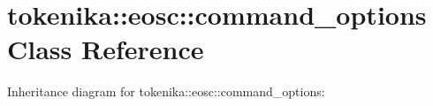 \hypertarget{classtokenika_1_1eosc_1_1command__options}{}\section{tokenika\+:\+:eosc\+:\+:command\+\_\+options Class Reference}
\label{classtokenika_1_1eosc_1_1command__options}


Inheritance diagram for tokenika\+:\+:eosc\+:\+:command\+\_\+options\+:
